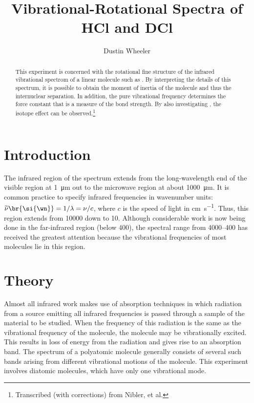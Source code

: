 \documentclass[nobib,nofonts,nols,nohyper]{tufte-handout}
\title{Vibrational-Rotational Spectra of HCl and DCl}
\author{Dustin Wheeler}
\begin{document}
\maketitle%

\begin{abstract}
\noindent
This experiment is concerned with the rotational fine structure of the infrared vibrational spectrom of a linear molecule such as . By interpreting the details of this spectrum, it is possible to obtain the moment of inertia of the molecule and thus the internuclear separation. In addition, the pure vibrational frequency determines the force constant that is a measure of the bond strength. By also investigating , the isotope effect can be observed.\thanks{Transcribed (with corrections) from Nibler, et al.}
\end{abstract}

\section{Introduction} %
\label{sec:intro}

The infrared region of the spectrum extends from the long-wavelength end of the visible region at \SI{1}{\micro\m} out to the microwave region at about \SI{1000}{\micro\m}. 
It is common practice to specify infrared frequencies in wavenumber units: \( \widetilde{\nu}\br{\si{\wn}} = 1/\lambda = \nu/c \), where \( c \) is the speed of light in \si{\cm \per \s}. 
Thus, this region extends from \SI{10000}{\wn} down to \SI{10}{\wn}. 
Although considerable work is now being done in the far-infrared region (below \SI{400}{\wn}), the spectral range from \SIrange{4000}{400}{\wn} has received the greatest attention because the vibrational frequencies of most molecules lie in this region. 


\section{Theory} %
\label{sec:theory}

Almost all infrared work makes use of absorption techniques in which radiation from a source emitting all infrared frequencies is passed through a sample of the material to be studied. 
When the frequency of this radiation is the same as the vibrational frequency of the molecule, the molecule may be vibrationally excited.
This results in loss of energy from the radiation and gives rise to an absorption band. 
The spectrum of a polyatomic molecule generally consists of several such bands arising from different vibrational motions of the molecule. 
This experiment involves diatomic molecules, which have only one vibrational mode. 
\end{document}

